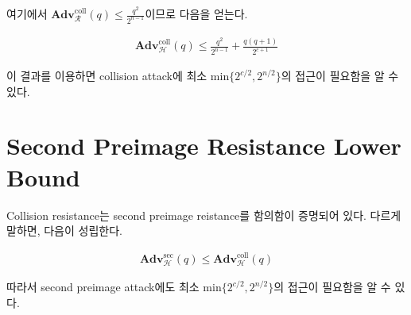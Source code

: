 \documentclass{article}
\newcommand{\adv}{\mathbf{Adv}}
\begin{document}
  여기에서 \(\adv^\text{coll}_\mathcal{R}(q) \leq \frac{q^2}{2^{n - 1}}\)이므로 다음을 얻는다.

  \begin{align*}
    \adv^\text{coll}_\mathcal{H}(q) \leq \frac{q^2}{2^{n - 1}} + \frac{q(q + 1)}{2^{c + 1}}
  \end{align*}

  이 결과를 이용하면 collision attack에 최소 \(\mathrm{min}\{2^{c/2}, 2^{n/2}\}\)의 접근이 필요함을 알 수 있다.

  \section{Second Preimage Resistance Lower Bound}
  Collision resistance는 second preimage reistance를 함의함이 증명되어 있다.\cite{rogaway_cryptographic_2004} 다르게 말하면, 다음이 성립한다.

  \begin{align*}
    \adv^\text{sec}_\mathcal{H}(q) \leq \adv^\text{coll}_\mathcal{H}(q)
  \end{align*}

  따라서 second preimage attack에도 최소 \(\mathrm{min}\{2^{c/2}, 2^{n/2}\}\)의 접근이 필요함을 알 수 있다.
  \printbibliography
\end{document}
